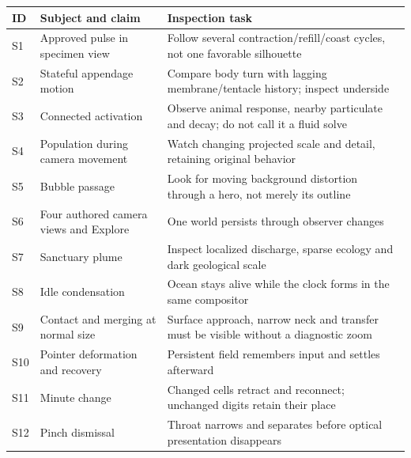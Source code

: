 \documentclass[
  english,
  11pt,
]{article}
\newcounter{none} %
\begin{document}
{\def\LTcaptype{none} %
\begin{longtable}[]{@{}
  >{\raggedright\arraybackslash}p{}
  >{\raggedright\arraybackslash}p{}
  >{\raggedright\arraybackslash}p{}@{}}
\toprule\noalign{}
\begin{minipage}[b]{\linewidth}\raggedright
ID
\end{minipage} & \begin{minipage}[b]{\linewidth}\raggedright
Subject and claim
\end{minipage} & \begin{minipage}[b]{\linewidth}\raggedright
Inspection task
\end{minipage} \\
\midrule\noalign{}
\endhead
\bottomrule\noalign{}
\endlastfoot
S1 & Approved pulse in specimen view & Follow several
contraction/refill/coast cycles, not one favorable silhouette \\
S2 & Stateful appendage motion & Compare body turn with lagging
membrane/tentacle history; inspect underside \\
S3 & Connected activation & Observe animal response, nearby particulate
and decay; do not call it a fluid solve \\
S4 & Population during camera movement & Watch changing projected scale
and detail, retaining original behavior \\
S5 & Bubble passage & Look for moving background distortion through a
hero, not merely its outline \\
S6 & Four authored camera views and Explore & One world persists through
observer changes \\
S7 & Sanctuary plume & Inspect localized discharge, sparse ecology and
dark geological scale \\
S8 & Idle condensation & Ocean stays alive while the clock forms in the
same compositor \\
S9 & Contact and merging at normal size & Surface approach, narrow neck
and transfer must be visible without a diagnostic zoom \\
S10 & Pointer deformation and recovery & Persistent field remembers
input and settles afterward \\
S11 & Minute change & Changed cells retract and reconnect; unchanged
digits retain their place \\
S12 & Pinch dismissal & Throat narrows and separates before optical
presentation disappears \\
\end{longtable}
}
\end{document}

